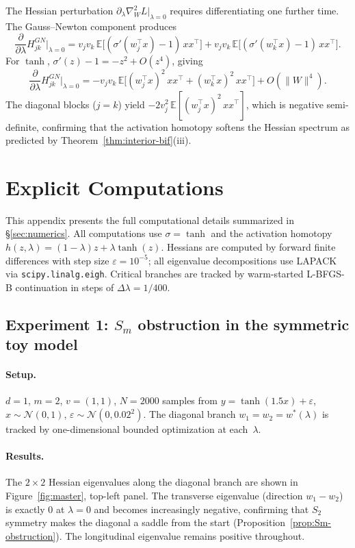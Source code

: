 \documentclass[11pt, reqno]{amsart}
\theoremstyle{plain}
\theoremstyle{definition}
\theoremstyle{remark}
\begin{document}
The Hessian perturbation $\partial_\lambda\nabla_W^2 L|_{\lambda=0}$ requires differentiating one further time. The Gauss--Newton component produces
\begin{equation}
  \frac{\partial}{\partial\lambda}H^{GN}_{jk}\Big|_{\lambda=0}
  =v_jv_k\,\mathbb E\bigl[(\sigma'(w_j^\top x)-1)\,xx^\top\bigr]
  +v_jv_k\,\mathbb E\bigl[(\sigma'(w_k^\top x)-1)\,xx^\top\bigr].
\end{equation}
For $\tanh$, $\sigma'(z)-1=-z^2+O(z^4)$, giving
\begin{equation}
  \frac{\partial}{\partial\lambda}H^{GN}_{jk}\Big|_{\lambda=0}
  =-v_jv_k\,\mathbb E\bigl[(w_j^\top x)^2\,xx^\top+(w_k^\top x)^2\,xx^\top\bigr]+O(\|W\|^4).
\end{equation}
The diagonal blocks ($j=k$) yield $-2v_j^2\,\mathbb E[(w_j^\top x)^2\,xx^\top]$, which is negative semi-definite, confirming that the activation homotopy softens the Hessian spectrum as predicted by Theorem~\ref{thm:interior-bif}(iii).

\section{Explicit Computations}\label{app:numerics}
This appendix presents the full computational details summarized in \S\ref{sec:numerics}. All computations use $\sigma=\tanh$ and the activation homotopy $h(z,\lambda)=(1-\lambda)z+\lambda\tanh(z)$. Hessians are computed by forward finite differences with step size $\varepsilon=10^{-5}$; all eigenvalue decompositions use LAPACK via \texttt{scipy.linalg.eigh}. Critical branches are tracked by warm-started L-BFGS-B continuation in steps of $\Delta\lambda=1/400$.

\subsection{Experiment 1: $S_m$ obstruction in the symmetric toy model}

\paragraph{Setup.}
$d=1$, $m=2$, $v=(1,1)$, $N=2000$ samples from $y=\tanh(1.5x)+\varepsilon$, $x\sim\mathcal N(0,1)$, $\varepsilon\sim\mathcal N(0,0.02^2)$. The diagonal branch $w_1=w_2=w^*(\lambda)$ is tracked by one-dimensional bounded optimization at each~$\lambda$.

\paragraph{Results.}
The $2\times 2$ Hessian eigenvalues along the diagonal branch are shown in Figure~\ref{fig:master}, top-left panel. The transverse eigenvalue (direction $w_1-w_2$) is exactly $0$ at $\lambda=0$ and becomes increasingly negative, confirming that $S_2$ symmetry makes the diagonal a saddle from the start (Proposition~\ref{prop:Sm-obstruction}). The longitudinal eigenvalue remains positive throughout.
\end{document}
